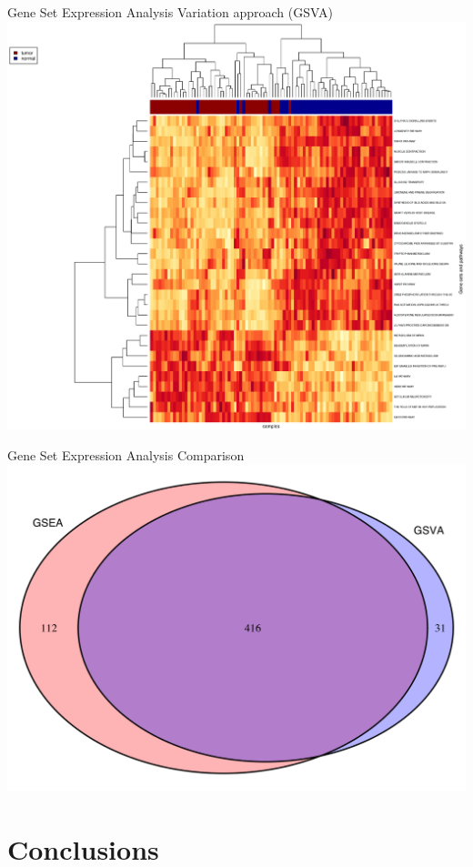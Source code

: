 \documentclass{beamer}
\begin{document}
\begin{frame}{Gene Set Expression Analysis}{ Variation  approach (GSVA)}
   \centering
        \includegraphics[width=1\textwidth,height=0.8\textheight,keepaspectratio]{ClusteringGSVA.eps}

\end{frame}


\begin{frame}{Gene Set Expression Analysis}{ Comparison}
\centering
        \includegraphics[width=.7\textwidth,height=0.8\textheight,keepaspectratio]{venn}
\end{frame}




\section{Conclusions}
\end{document}
